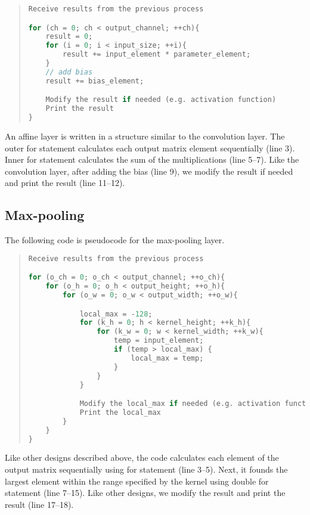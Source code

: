 \begin{quote}
\begin{lstlisting}[language=C, frame=l]
Receive results from the previous process

for (ch = 0; ch < output_channel; ++ch){
    result = 0;
    for (i = 0; i < input_size; ++i){
        result += input_element * parameter_element;
    }
    // add bias
    result += bias_element;

    Modify the result if needed (e.g. activation function)
    Print the result
}
\end{lstlisting}
\end{quote}


An affine layer is written in a structure similar to the convolution layer. The outer for statement calculates each output matrix element sequentially (line 3). Inner for statement calculates the sum of the multiplications (line 5--7). Like the convolution layer, after adding the bias (line 9), we modify the result if needed and print the result (line 11--12).

\subsection{Max-pooling}
The following code is pseudocode for the max-pooling layer.
\begin{quote}
\begin{lstlisting}[language=C, frame=l]
Receive results from the previous process

for (o_ch = 0; o_ch < output_channel; ++o_ch){
    for (o_h = 0; o_h < output_height; ++o_h){
        for (o_w = 0; o_w < output_width; ++o_w){

            local_max = -128;
            for (k_h = 0; h < kernel_height; ++k_h){
                for (k_w = 0; w < kernel_width; ++k_w){
                    temp = input_element;
                    if (temp > local_max) {
                        local_max = temp;
                    }
                }
            }

            Modify the local_max if needed (e.g. activation function)
            Print the local_max
        }
    }
}
\end{lstlisting}
\end{quote}

Like other designs described above, the code calculates each element of the output matrix sequentially using for statement (line 3--5). Next, it founds the largest element within the range specified by the kernel using double for statement (line 7--15). Like other designs, we modify the result and print the result (line 17--18).

